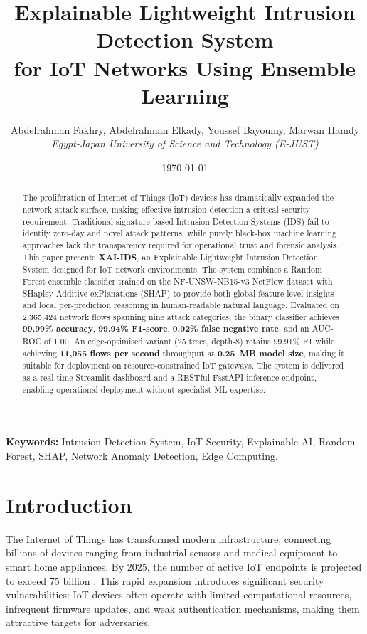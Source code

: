 \documentclass[12pt,a4paper]{article}
\title{%
  \vspace{-1cm}
  {\Large \textbf{Explainable Lightweight Intrusion Detection System}} \\[6pt]
  {\large for IoT Networks Using Ensemble Learning}
}
\author{
  Abdelrahman Fakhry, Abdelrahman Elkady, Youssef Bayoumy, Marwan Hamdy \\
  \textit{Egypt-Japan University of Science and Technology (E-JUST)} \\
  \texttt{}
}
\date{\today}
\begin{document}
\maketitle
\thispagestyle{empty}

\begin{abstract}
The proliferation of Internet of Things (IoT) devices has dramatically expanded the
network attack surface, making effective intrusion detection a critical security
requirement. Traditional signature-based Intrusion Detection Systems (IDS) fail to
identify zero-day and novel attack patterns, while purely black-box machine learning
approaches lack the transparency required for operational trust and forensic analysis.
This paper presents \textbf{XAI-IDS}, an Explainable Lightweight Intrusion Detection
System designed for IoT network environments. The system combines a Random Forest
ensemble classifier trained on the NF-UNSW-NB15-v3 NetFlow dataset with
SHapley Additive exPlanations (SHAP) to provide both global feature-level insights
and local per-prediction reasoning in human-readable natural language.
Evaluated on 2,365,424 network flows spanning nine attack categories, the binary
classifier achieves \textbf{99.99\% accuracy}, \textbf{99.94\% F1-score},
\textbf{0.02\% false negative rate}, and an AUC-ROC of 1.00.
An edge-optimised variant (25 trees, depth-8) retains 99.91\% F1 while achieving
\textbf{11,055 flows per second} throughput at \textbf{0.25~MB model size},
making it suitable for deployment on resource-constrained IoT gateways.
The system is delivered as a real-time Streamlit dashboard and a RESTful FastAPI
inference endpoint, enabling operational deployment without specialist ML expertise.
\end{abstract}

\textbf{Keywords:} Intrusion Detection System, IoT Security, Explainable AI, Random
Forest, SHAP, Network Anomaly Detection, Edge Computing.

\newpage
\tableofcontents
\newpage

\section{Introduction}
\label{sec:intro}

The Internet of Things has transformed modern infrastructure, connecting billions of
devices ranging from industrial sensors and medical equipment to smart home appliances.
By 2025, the number of active IoT endpoints is projected to exceed 75 billion
\cite{ferrag2020deep}. This rapid expansion introduces significant security
vulnerabilities: IoT devices often operate with limited computational resources,
infrequent firmware updates, and weak authentication mechanisms, making them
attractive targets for adversaries.
\end{document}
